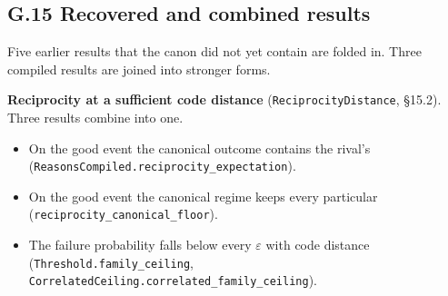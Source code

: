 \documentclass[
]{article}
\providecommand{\tightlist}{%
  \setlength{\itemsep}{0pt}\setlength{\parskip}{0pt}}
\begin{document}
\subsection{G.15 Recovered and combined
results}\label{g.15-recovered-and-combined-results}

Five earlier results that the canon did not yet contain are folded in.
Three compiled results are joined into stronger forms.

\textbf{Reciprocity at a sufficient code distance}
(\texttt{R\allowbreak{}e\allowbreak{}c\allowbreak{}i\allowbreak{}p\allowbreak{}r\allowbreak{}o\allowbreak{}c\allowbreak{}i\allowbreak{}t\allowbreak{}y\allowbreak{}D\allowbreak{}i\allowbreak{}s\allowbreak{}t\allowbreak{}a\allowbreak{}n\allowbreak{}c\allowbreak{}e},
§15.2). Three results combine into one.

\begin{itemize}
\tightlist
\item
  On the good event the canonical outcome contains the rival's
  (\texttt{R\allowbreak{}e\allowbreak{}a\allowbreak{}s\allowbreak{}o\allowbreak{}n\allowbreak{}s\allowbreak{}C\allowbreak{}o\allowbreak{}m\allowbreak{}p\allowbreak{}i\allowbreak{}l\allowbreak{}e\allowbreak{}d\allowbreak{}.\allowbreak{}r\allowbreak{}e\allowbreak{}c\allowbreak{}i\allowbreak{}p\allowbreak{}r\allowbreak{}o\allowbreak{}c\allowbreak{}i\allowbreak{}t\allowbreak{}y\allowbreak{}\_\allowbreak{}e\allowbreak{}x\allowbreak{}p\allowbreak{}e\allowbreak{}c\allowbreak{}t\allowbreak{}a\allowbreak{}t\allowbreak{}i\allowbreak{}o\allowbreak{}n}).
\item
  On the good event the canonical regime keeps every particular
  (\texttt{r\allowbreak{}e\allowbreak{}c\allowbreak{}i\allowbreak{}p\allowbreak{}r\allowbreak{}o\allowbreak{}c\allowbreak{}i\allowbreak{}t\allowbreak{}y\allowbreak{}\_\allowbreak{}c\allowbreak{}a\allowbreak{}n\allowbreak{}o\allowbreak{}n\allowbreak{}i\allowbreak{}c\allowbreak{}a\allowbreak{}l\allowbreak{}\_\allowbreak{}f\allowbreak{}l\allowbreak{}o\allowbreak{}o\allowbreak{}r}).
\item
  The failure probability falls below every \(\varepsilon\) with code
  distance
  (\texttt{T\allowbreak{}h\allowbreak{}r\allowbreak{}e\allowbreak{}s\allowbreak{}h\allowbreak{}o\allowbreak{}l\allowbreak{}d\allowbreak{}.\allowbreak{}f\allowbreak{}a\allowbreak{}m\allowbreak{}i\allowbreak{}l\allowbreak{}y\allowbreak{}\_\allowbreak{}c\allowbreak{}e\allowbreak{}i\allowbreak{}l\allowbreak{}i\allowbreak{}n\allowbreak{}g},
  \texttt{C\allowbreak{}o\allowbreak{}r\allowbreak{}r\allowbreak{}e\allowbreak{}l\allowbreak{}a\allowbreak{}t\allowbreak{}e\allowbreak{}d\allowbreak{}C\allowbreak{}e\allowbreak{}i\allowbreak{}l\allowbreak{}i\allowbreak{}n\allowbreak{}g\allowbreak{}.\allowbreak{}c\allowbreak{}o\allowbreak{}r\allowbreak{}r\allowbreak{}e\allowbreak{}l\allowbreak{}a\allowbreak{}t\allowbreak{}e\allowbreak{}d\allowbreak{}\_\allowbreak{}f\allowbreak{}a\allowbreak{}m\allowbreak{}i\allowbreak{}l\allowbreak{}y\allowbreak{}\_\allowbreak{}c\allowbreak{}e\allowbreak{}i\allowbreak{}l\allowbreak{}i\allowbreak{}n\allowbreak{}g}).
\end{itemize}
\end{document}
